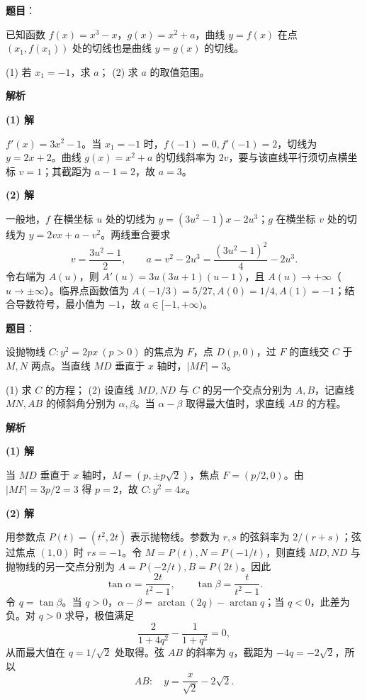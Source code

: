 \begin{answer}

\textbf{题目}：

已知函数 $f(x)=x^3-x$，$g(x)=x^2+a$，曲线 $y=f(x)$ 在点 $(x_1,f(x_1))$ 处的切线也是曲线 $y=g(x)$ 的切线。

(1) 若 $x_1=-1$，求 $a$；  
(2) 求 $a$ 的取值范围。

\textbf{解析}

\textbf{(1) 解}

$f'(x)=3x^2-1$。当 $x_1=-1$ 时，$f(-1)=0,f'(-1)=2$，切线为 $y=2x+2$。曲线 $g(x)=x^2+a$ 的切线斜率为 $2v$，要与该直线平行须切点横坐标 $v=1$；其截距为 $a-1=2$，故 $a=3$。

\textbf{(2) 解}

一般地，$f$ 在横坐标 $u$ 处的切线为 $y=(3u^2-1)x-2u^3$；$g$ 在横坐标 $v$ 处的切线为 $y=2vx+a-v^2$。两线重合要求
\nopagebreak[4]
\[v=\frac{3u^2-1}{2},\qquad
a=v^2-2u^3=\frac{(3u^2-1)^2}{4}-2u^3.\]
令右端为 $A(u)$，则 $A'(u)=3u(3u+1)(u-1)$，且 $A(u)\to+\infty$（$u\to\pm\infty$）。临界点函数值为 $A(-1/3)=5/27,A(0)=1/4,A(1)=-1$；结合导数符号，最小值为 $-1$，故 $a\in[-1,+\infty)$。


\gkanswer{答案（2）：$a\in[-1,+\infty)$}

\end{answer}
\begin{answer}

\textbf{题目}：

设抛物线 $C:y^2=2px\ (p>0)$ 的焦点为 $F$，点 $D(p,0)$，过 $F$ 的直线交 $C$ 于 $M,N$ 两点。当直线 $MD$ 垂直于 $x$ 轴时，$|MF|=3$。

(1) 求 $C$ 的方程；  
(2) 设直线 $MD,ND$ 与 $C$ 的另一个交点分别为 $A,B$，记直线 $MN,AB$ 的倾斜角分别为 $\alpha,\beta$。当 $\alpha-\beta$ 取得最大值时，求直线 $AB$ 的方程。

\textbf{解析}

\textbf{(1) 解}

当 $MD$ 垂直于 $x$ 轴时，$M=(p,\pm p\sqrt2)$，焦点 $F=(p/2,0)$。由 $|MF|=3p/2=3$ 得 $p=2$，故 $C:y^2=4x$。

\textbf{(2) 解}

用参数点 $P(t)=(t^2,2t)$ 表示抛物线。参数为 $r,s$ 的弦斜率为 $2/(r+s)$；弦过焦点 $(1,0)$ 时 $rs=-1$。令 $M=P(t),N=P(-1/t)$，则直线 $MD,ND$ 与抛物线的另一交点分别为 $A=P(-2/t),B=P(2t)$。因此
\nopagebreak[4]
\[\tan\alpha=\frac{2t}{t^2-1},\qquad
\tan\beta=\frac{t}{t^2-1}.\]
令 $q=\tan\beta$。当 $q>0$，$\alpha-\beta=\arctan(2q)-\arctan q$；当 $q<0$，此差为负。对 $q>0$ 求导，极值满足
\nopagebreak[4]
\[\frac{2}{1+4q^2}-\frac{1}{1+q^2}=0,\]
从而最大值在 $q=1/\sqrt2$ 处取得。弦 $AB$ 的斜率为 $q$，截距为 $-4q=-2\sqrt2$，所以
\nopagebreak[4]
\[AB:\quad y=\frac{x}{\sqrt2}-2\sqrt2.\]



\end{answer}
